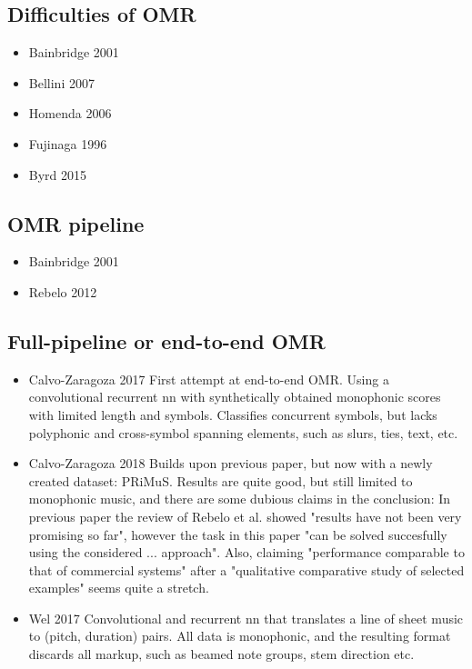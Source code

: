 \subsection{Difficulties of OMR}
\begin{itemize}
    \item Bainbridge 2001 \citep{Bainbridge2001} 
    \item Bellini 2007 \citep{Bellini2007}
    \item Homenda 2006 \citep{Homenda2006} 
    \item Fujinaga 1996 \citep{Fujinaga1996}
    \item Byrd 2015 \citep{Byrd2015}
\end{itemize}

\subsection{OMR pipeline}
\begin{itemize}
    \item Bainbridge 2001 \citep{Bainbridge2001} 
    \item Rebelo 2012 \citep{Rebelo2012} 
\end{itemize}

\subsection{Full-pipeline or end-to-end OMR}
\begin{itemize}
    \item Calvo-Zaragoza 2017 \citep{CalvoZaragoza2017} First attempt at end-to-end OMR. Using a convolutional recurrent nn with synthetically obtained monophonic scores with limited length and symbols. Classifies concurrent symbols, but lacks polyphonic and cross-symbol spanning elements, such as slurs, ties, text, etc.
    \item Calvo-Zaragoza 2018 \citep{CalvoZaragoza2018} Builds upon previous paper, but now with a newly created dataset: PRiMuS. Results are quite good, but still limited to monophonic music, and there are some dubious claims in the conclusion: In previous paper the review of Rebelo et al. \citep{Rebelo2012} showed "results have not been very promising so far", however the task in this paper "can be solved succesfully using the considered ... approach". Also, claiming "performance comparable to that of commercial systems" after a "qualitative comparative study of selected examples" seems quite a stretch.
    \item Wel 2017 \citep{Wel2017} Convolutional and recurrent nn that translates a line of sheet music to (pitch, duration) pairs. All data is monophonic, and the resulting format discards all markup, such as beamed note groups, stem direction etc.
\end{itemize}

